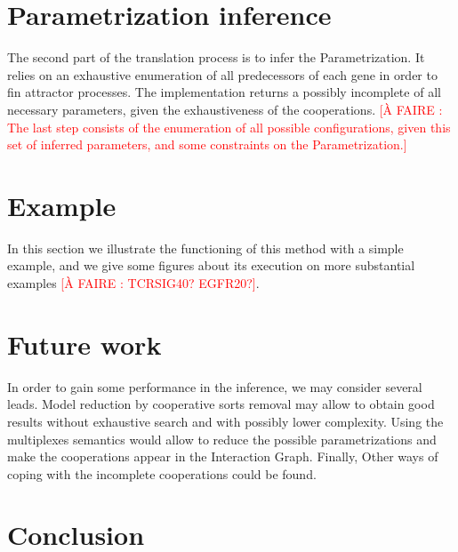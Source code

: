 \documentclass{llncs}
\newcommand{\afaire}[1]{\textcolor{red}{[À FAIRE : #1]}}
\begin{document}
\section{Parametrization inference}
The second part of the translation process is to infer the Parametrization. It relies on an exhaustive enumeration of all predecessors of each gene in order to fin attractor processes. The implementation returns a possibly incomplete of all necessary parameters, given the exhaustiveness of the cooperations. \afaire{The last step consists of the enumeration of all possible configurations, given this set of inferred parameters, and some constraints on the Parametrization.}

\section{Example}
In this section we illustrate the functioning of this method with a simple example, and we give some figures about its execution on more substantial examples \afaire{TCRSIG40? EGFR20?}.

\section{Future work}
In order to gain some performance in the inference, we may consider several leads. Model reduction by cooperative sorts removal may allow to obtain good results without exhaustive search and with possibly lower complexity. Using the multiplexes semantics would allow to reduce the possible parametrizations and make the cooperations appear in the Interaction Graph. Finally, Other ways of coping with the incomplete cooperations could be found.

\section{Conclusion}
\end{document}

